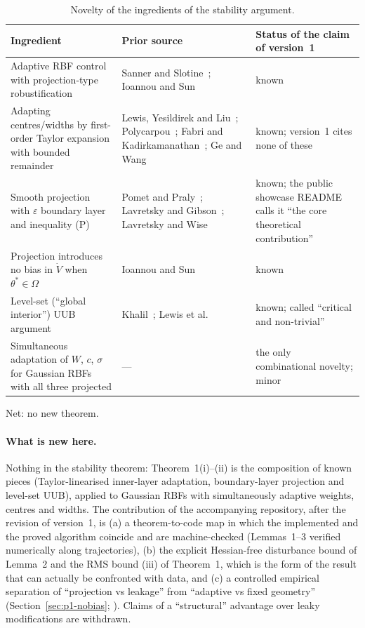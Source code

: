 \begin{table}[htbp]
\centering\small
\caption{Novelty of the ingredients of the stability argument.}\label{tab:part1:novelty}
\begin{tabularx}{\textwidth}{@{}YYY@{}}
\toprule
Ingredient & Prior source & Status of the claim of version~1\\
\midrule
Adaptive RBF control with projection-type robustification
  & Sanner and Slotine~\cite{sanner1992}; Ioannou and Sun~\cite{ioannou1996}
  & known\\
Adapting centres/widths by first-order Taylor expansion with bounded remainder
  & Lewis, Yesildirek and Liu~\cite{lewis1996}; Polycarpou~\cite{polycarpou1996}; Fabri and
    Kadirkamanathan~\cite{fabri1996}; Ge and Wang~\cite{ge2002}
  & known; version~1 cites none of these\\
Smooth projection with $\varepsilon$ boundary layer and inequality (P)
  & Pomet and Praly~\cite{pp1992}; Lavretsky and Gibson~\cite{lavretsky2011}; Lavretsky and
    Wise~\cite{lavretsky2013}
  & known; the public showcase README calls it ``the core theoretical contribution''\\
Projection introduces no bias in $\dot V$ when $\theta^*\in\Omega$
  & Ioannou and Sun~\cite[\S4.4]{ioannou1996}
  & known\\
Level-set (``global interior'') UUB argument
  & Khalil~\cite[Thm.~4.18]{khalil2002}; Lewis et al.~\cite{lewis1999}
  & known; called ``critical and non-trivial''\\
Simultaneous adaptation of $W$, $c$, $\sigma$ for Gaussian RBFs with all three projected
  & ---
  & the only combinational novelty; minor\\
\bottomrule
\end{tabularx}
\end{table}

\noindent Net: no new theorem.

\paragraph{What is new here.} Nothing in the stability theorem: Theorem~1(i)--(ii) is the composition of known pieces
(Taylor-linearised inner-layer adaptation, boundary-layer projection and level-set UUB), applied to Gaussian RBFs with
simultaneously adaptive weights, centres and widths. The contribution of the accompanying repository, after the
revision of version~1, is
(a) a theorem-to-code map in which the implemented and the proved algorithm coincide and are machine-checked
(Lemmas~1--3 verified numerically along trajectories),
(b) the explicit Hessian-free disturbance bound of Lemma~2 and the RMS bound (iii) of Theorem~1, which is the form of
the result that can actually be confronted with data, and
(c) a controlled empirical separation of ``projection vs leakage'' from ``adaptive vs fixed geometry''
(Section~\ref{sec:p1-nobias}; ).
Claims of a ``structural'' advantage over leaky modifications are withdrawn.

